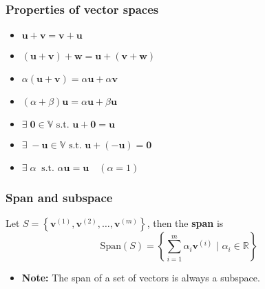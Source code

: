 \documentclass{article}
\begin{document}
    
    \subsubsection{Properties of vector spaces}
        \begin{definition}
            \begin{itemize}
                \item $\mathbf{u} + \mathbf{v} = \mathbf{v} + \mathbf{u}$
                \item $(\mathbf{u} + \mathbf{v}) + \mathbf{w} = \mathbf{u} + (\mathbf{v} + \mathbf{w})$
                \item $\alpha (\mathbf{u} + \mathbf{v}) = \alpha \mathbf{u} + \alpha \mathbf{v}$
                \item $(\alpha + \beta)\mathbf{u} = \alpha \mathbf{u} + \beta \mathbf{u}$
                \item $\exists\; \mathbf{0} \in \mathbb{V} \text{ s.t. } \mathbf{u} + \mathbf{0} = \mathbf{u}$
                \item $\exists\; -\mathbf{u} \in \mathbb{V} \text{ s.t. } \mathbf{u} + (-\mathbf{u}) = \mathbf{0}$
                \item $\exists\; \alpha \: \text{ s.t. } \alpha \mathbf{u} = \mathbf{u} \quad (\alpha = 1)$
            \end{itemize}
        \end{definition}

    \subsubsection{Span and subspace}
        \begin{definition}
            Let \( S = \left\{\mathbf{v}^{(1)}, \mathbf{v}^{(2)}, \ldots, \mathbf{v}^{(m)}\right\} \), then the \textbf{span} is
            \begin{equation*}
                \text{Span}(S) = \left\{\sum_{i=1}^{m} \alpha_i \mathbf{v}^{(i)} \text{ | } \alpha_i \in \mathbb{R}\right\}
            \end{equation*}
            \begin{itemize}
                \item \textbf{Note:} The span of a set of vectors is always a subspace.
            \end{itemize}
        \end{definition}
\end{document}
